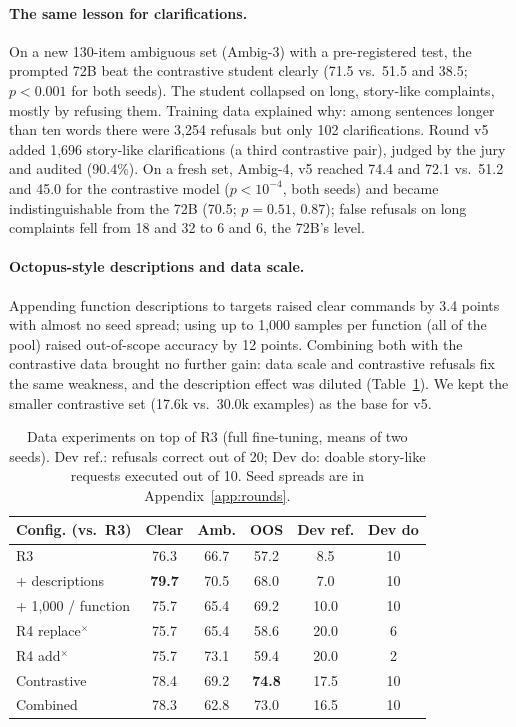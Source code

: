 \paragraph{The same lesson for clarifications.} On a new 130-item ambiguous set (Ambig-3) with a pre-registered test, the
prompted 72B beat the contrastive student clearly (71.5 vs.\ 51.5 and 38.5; $p<0.001$ for both seeds). The student collapsed
on long, story-like complaints, mostly by refusing them. Training data explained why: among sentences longer than ten words
there were 3,254 refusals but only 102 clarifications. Round v5 added 1,696 story-like clarifications (a third contrastive
pair), judged by the jury and audited (90.4\%). On a fresh set, Ambig-4, v5 reached 74.4 and 72.1 vs.\ 51.2 and 45.0 for the
contrastive model ($p<10^{-4}$, both seeds) and became indistinguishable from the 72B (70.5; $p=0.51$, $0.87$); false
refusals on long complaints fell from 18 and 32 to 6 and 6, the 72B's level.

\paragraph{Octopus-style descriptions and data scale.} Appending function descriptions to targets raised clear commands by
3.4 points with almost no seed spread; using up to 1,000 samples per function (all of the pool) raised out-of-scope accuracy by
12 points. Combining both with the contrastive data brought no further gain: data scale and contrastive refusals fix the
same weakness, and the description effect was diluted (Table~\ref{tab:ablation}). We kept the smaller contrastive set
(17.6k vs.\ 30.0k examples) as the base for v5.

\begin{table}[t]
\centering\small
\setlength{\tabcolsep}{3pt}
\begin{tabular}{@{}lccccc@{}}
\toprule
Config. (vs.\ R3) & Clear & Amb. & OOS & Dev ref. & Dev do \\
\midrule
R3 & 76.3 & 66.7 & 57.2 & 8.5 & 10 \\
+ descriptions & \textbf{79.7} & 70.5 & 68.0 & 7.0 & 10 \\
+ 1,000 / function & 75.7 & 65.4 & 69.2 & 10.0 & 10 \\
R4 replace$^{\times}$ & 75.7 & 65.4 & 58.6 & 20.0 & 6 \\
R4 add$^{\times}$ & 75.7 & 73.1 & 59.4 & 20.0 & 2 \\
Contrastive & 78.4 & 69.2 & \textbf{74.8} & 17.5 & 10 \\
Combined & 78.3 & 62.8 & 73.0 & 16.5 & 10 \\
\bottomrule
\end{tabular}
\caption{Data experiments on top of R3 (full fine-tuning, means of two seeds). Dev ref.: refusals correct out of 20; Dev do:
doable story-like requests executed out of 10. Seed spreads are in Appendix~\ref{app:rounds}.}
\label{tab:ablation}
\end{table}

